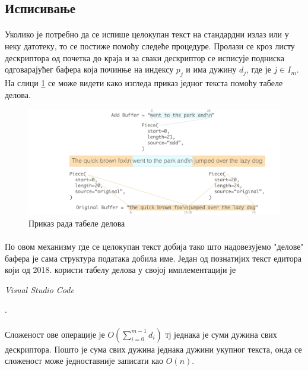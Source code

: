\documentclass[12pt,oneside]{memoir}
\begin{document}
\subsection{Исписивање}
\paragraph{}
Уколико је потребно да се испише целокупан текст на стандардни излаз или у неку датотеку,
то се постиже помоћу следеће процедуре. Пролази се кроз листу дескриптора од почетка до краја
и за сваки дескриптор се исписује подниска одговарајућег бафера која починње на индексу 
\(p_j\) и има дужину \(d_j\), где је \(j \in I_m\). На слици \ref{fig:piece_table} се може
видети како изгледа приказ једног текста помоћу табеле делова.

\begin{figure}[!ht]
	\centering
	\includegraphics[width=1.0\textwidth]{images/piece_table.png}
	\caption{Приказ рада табеле делова}
	\label{fig:piece_table}
\end{figure}

\paragraph{}
По овом механизму где се целокупан текст добија тако што надовезујемо "делове" бафера је сама
структура података добила име. Један од познатијих текст едитора који од 2018. 
користи табелу делова у својој имплементацији је \begin{latinica}\textit{Visual Studio Code}\end{latinica} \cite{VSC}.

\paragraph{}
Сложеност ове операције је \(O(\sum_{i=0}^{m-1} d_i)\) тј једнака је суми
дужина свих дескриптора. Пошто је сума свих дужина једнака дужини укупног текста, онда
се сложеност може једноставније записати као \(O(n)\).
\end{document}

